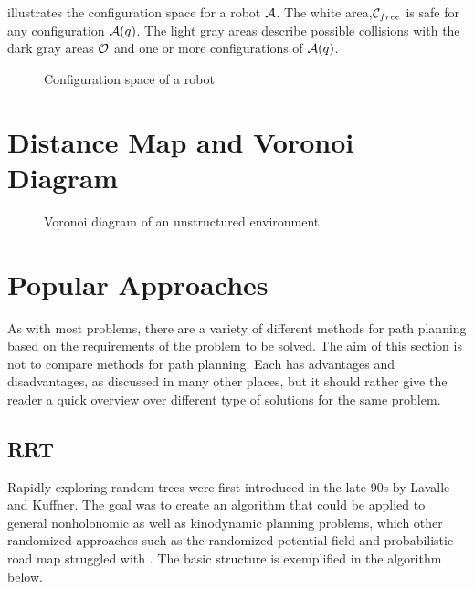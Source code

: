 illustrates the configuration space for a robot $\mathcal{A}$. The white area,$\mathcal{C}_{free}$ is safe for any configuration $\mathcal{A}(q)$. The light gray areas describe possible collisions with the dark gray areas $\mathcal{O}$ and one or more configurations of $\mathcal{A}(q)$.

\begin{figure}[h]
    \caption{Configuration space of a robot}
    \label{fig:configurationSpace}
\end{figure}

\section{Distance Map and Voronoi Diagram}

\begin{figure}[h]
    \caption{Voronoi diagram of an unstructured environment}
    \label{fig:voronoiDiagram}
\end{figure}

\section{Popular Approaches}
As with most problems, there are a variety of different methods for path planning based on the requirements of the problem to be solved. The aim of this section is not to compare methods for path planning. Each has advantages and disadvantages, as discussed in many other places, but it should rather give the reader a quick overview over different type of solutions for the same problem. %

\subsection{RRT}
Rapidly-exploring random trees were first introduced in the late 90s by Lavalle and Kuffner. The goal was to create an algorithm that could be applied to general nonholonomic as well as kinodynamic planning problems, which other randomized approaches such as the randomized potential field and probabilistic road map struggled with \cite{Lavalle.1998}. The basic structure is exemplified in the algorithm below.

